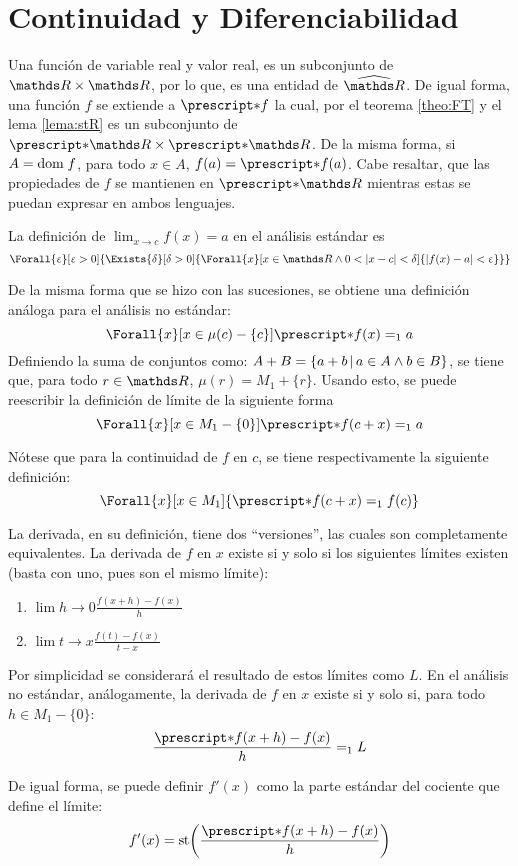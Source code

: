 \section{Continuidad y Diferenciabilidad}

Una función de variable real y valor real, es un subconjunto de
$\R\times\R$, por lo que, es una entidad de $\Rh$. De igual forma, una
función $f$ se extiende a $\st{f}$ la cual, por el teorema \ref{theo:FT}
y el lema \ref{lema:stR} es un subconjunto de $\st{\R}\times\st{\R}$.
De la misma forma, si $A=\text{dom}\; f$, para todo $x\in A$, $f(a) = \st{f(a)}$.
Cabe resaltar, que las propiedades de $f$ se mantienen en $\st{\R}$
mientras estas se puedan expresar en ambos lenguajes.

La definición de $\lim_{x\to c} f(x) = a$ en el análisis estándar es
\[
  \Forall{\e}[\e>0]{
    \Exists{\delta}[\delta>0]{
      \Forall{x}[x\in\R\land 0< |x-c|<\delta]{|f(x)-a|<\e}
    }
  }  
\]

De la misma forma que se hizo con las sucesiones, se obtiene una
definición análoga para el análisis no estándar:
\[\Forall{x}[x\in\mu(c)-\{c\}]{\st{f(x)} =_1 a}\]
Definiendo la suma de conjuntos como:
$A+B = \left\{a+b\,\middle|\,a\in A \land b\in B\right\}$, se tiene que, para todo
$r\in\R$, $\mu(r) = M_1 + \{r\}$. Usando esto, se puede
reescribir la definición de límite de la siguiente forma
\[\Forall{x}[x\in M_1-\{0\}]{\st{f(c+x)}=_1 a}\]

Nótese que para la continuidad de $f$ en $c$, se tiene respectivamente
la siguiente definición:
\[\Forall{x}[x\in M_1]{\st{f(c+x)}=_1 f(c)}\]

La derivada, en su definición, tiene dos ``versiones'', las cuales son
completamente equivalentes. La derivada de $f$ en $x$ existe si y solo
si los siguientes límites existen (basta con uno, pues son el mismo límite):

\begin{enumerate}
  \item $\lim{h\to 0}\frac{f(x + h) - f(x)}{h}$
  \item $\lim{t\to x}\frac{f(t) - f(x)}{t - x}$
\end{enumerate}

Por simplicidad se considerará el resultado de estos límites como $L$.
En el análisis no estándar, análogamente, la derivada de $f$ en $x$
existe si y solo si, para todo $h\in M_1-\{0\}$:
\[\frac{\st{f(x + h)} - f(x)}{h} =_1 L\]

De igual forma, se puede definir $f'(x)$ como la parte estándar del
cociente que define el límite:
\[f'(x) = \sd{\frac{\st{f(x + h)} - f(x)}{h}}\]

